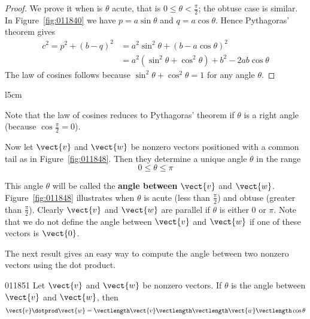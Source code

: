 \begin{proof} We prove it when is $\theta$ acute, that is $0 \leq \theta < \frac{\pi}{2}$; the obtuse case is similar. In Figure~\ref{fig:011840} we have $p = a \sin \theta$ and $q = a \cos \theta$. Hence Pythagoras' theorem gives
\begin{align*}
c^2 = p^2 + (b - q)^2 &= a^2\sin^2\theta + (b - a\cos\theta)^2 \\
					  &= a^2(\sin^2\theta + \cos^2\theta) +b^2 - 2ab\cos\theta
\end{align*}
The law of cosines follows because $\sin^{2} \theta + \cos^{2} \theta = 1$ for any angle $\theta$.
\end{proof}


\begin{wrapfigure}[13]{l}{5cm} 
\centering

\caption{\label{fig:011848}}
\end{wrapfigure}

\noindent Note that the law of cosines reduces to Pythagoras' theorem if $\theta$ is a right angle (because $\cos\frac{\pi}{2} = 0$).

Now let $\vect{v}$ and $\vect{w}$ be nonzero vectors positioned with a common tail as in Figure~\ref{fig:011848}. Then they determine a unique angle $\theta$ in the range
\begin{equation*}
0 \leq \theta \leq \pi
\end{equation*}

This angle $\theta$ will be called the \textbf{angle between} $\vect{v}$ and $\vect{w}$. Figure~\ref{fig:011848} illustrates when $\theta$ is acute (less than $\frac{\pi}{2}$) and obtuse (greater than $\frac{\pi}{2}$). Clearly $\vect{v}$ and $\vect{w}$ are parallel if $\theta$ is either $0$ or $\pi$. Note that we do not define the angle between $\vect{v}$ and $\vect{w}$ if one of these vectors is $\vect{0}$.


The next result gives an easy way to compute the angle between two nonzero vectors using the dot product.


\begin{theorem}{}{011851}
Let $\vect{v}$ and $\vect{w}$ be nonzero vectors. If $\theta$ is the angle between $\vect{v}$ and $\vect{w}$, then
\begin{equation*}
\vect{v} \dotprod \vect{w} = \vectlength \vect{v} \vectlength \vectlength \vect{w} \vectlength \cos\theta
\end{equation*}
\end{theorem}

